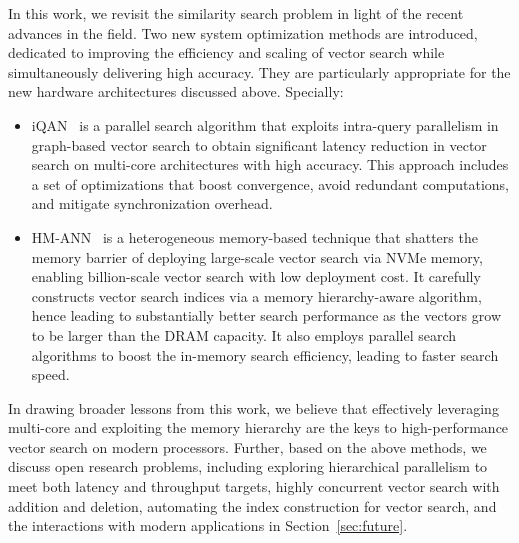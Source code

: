 In this work, we revisit the similarity search problem in light of the recent advances in the field. Two new system optimization methods are introduced, dedicated to improving the efficiency and scaling of vector search while simultaneously delivering high accuracy. They are particularly appropriate for the new hardware architectures discussed above. Specially:
\begin{itemize}
    \item iQAN~\cite{iqan} is a parallel search algorithm that exploits intra-query parallelism in graph-based vector search to obtain significant latency reduction in vector search on multi-core architectures with high accuracy. This approach includes a set of optimizations that boost convergence, avoid redundant computations, and mitigate synchronization overhead.
    \item HM-ANN~\cite{hm-ann} is a heterogeneous memory-based technique that shatters the memory barrier of deploying large-scale vector search via NVMe memory, enabling billion-scale vector search with low deployment cost. It carefully constructs vector search indices via a memory hierarchy-aware algorithm, hence leading to substantially better search performance as the vectors grow to be larger than the DRAM capacity. It also employs parallel search algorithms to boost the in-memory search efficiency, leading to faster search speed.    
\end{itemize} 

In drawing broader lessons from this work, we believe that effectively leveraging multi-core and exploiting the memory hierarchy are the keys to high-performance vector search on modern processors. Further, based on the above methods, we discuss open research problems, including exploring hierarchical parallelism to meet both latency and throughput targets, highly concurrent vector search with addition and deletion, automating the index construction for vector search, and the interactions with modern applications in Section~\ref{sec:future}. 







